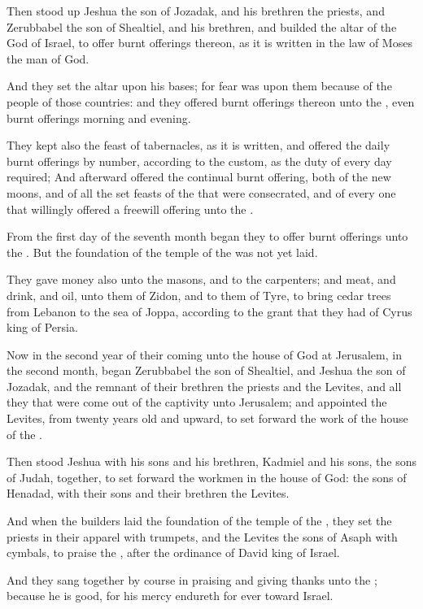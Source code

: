 \verse Then stood up Jeshua the son of Jozadak, and his brethren the priests, and Zerubbabel the son of Shealtiel, and his brethren, and builded the altar of the God of Israel, to offer burnt offerings thereon, as it is written in the law of Moses the man of God.

\verse And they set the altar upon his bases; for fear was upon them because of the people of those countries: and they offered burnt offerings thereon unto the \LORD, even burnt offerings morning and evening.

\verse They kept also the feast of tabernacles, as it is written, and offered the daily burnt offerings by number, according to the custom, as the duty of every day required; \verse And afterward offered the continual burnt offering, both of the new moons, and of all the set feasts of the \LORD that were consecrated, and of every one that willingly offered a freewill offering unto the \LORD.

\verse From the first day of the seventh month began they to offer burnt offerings unto the \LORD. But the foundation of the temple of the \LORD was not yet laid.

\verse They gave money also unto the masons, and to the carpenters; and meat, and drink, and oil, unto them of Zidon, and to them of Tyre, to bring cedar trees from Lebanon to the sea of Joppa, according to the grant that they had of Cyrus king of Persia.

\verse Now in the second year of their coming unto the house of God at Jerusalem, in the second month, began Zerubbabel the son of Shealtiel, and Jeshua the son of Jozadak, and the remnant of their brethren the priests and the Levites, and all they that were come out of the captivity unto Jerusalem; and appointed the Levites, from twenty years old and upward, to set forward the work of the house of the \LORD.

\verse Then stood Jeshua with his sons and his brethren, Kadmiel and his sons, the sons of Judah, together, to set forward the workmen in the house of God: the sons of Henadad, with their sons and their brethren the Levites.

\verse And when the builders laid the foundation of the temple of the \LORD, they set the priests in their apparel with trumpets, and the Levites the sons of Asaph with cymbals, to praise the \LORD, after the ordinance of David king of Israel.

\verse And they sang together by course in praising and giving thanks unto the \LORD; because he is good, for his mercy endureth for ever toward Israel.

